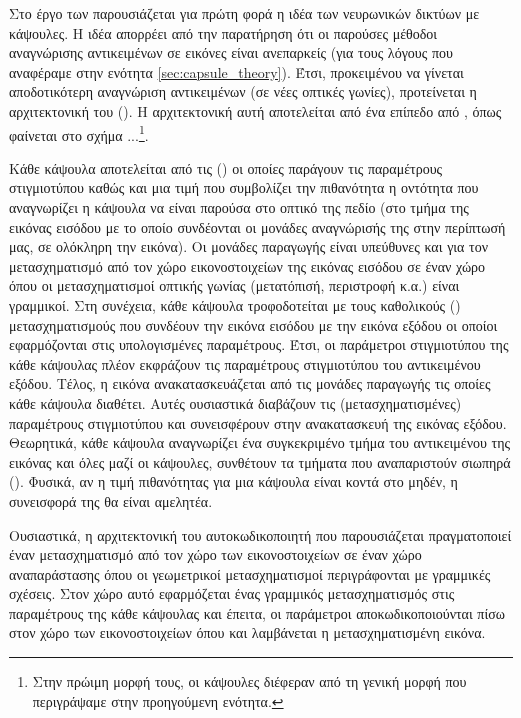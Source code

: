 Στο έργο των  \cite{hinton2011transforming} παρουσιάζεται για πρώτη φορά η ιδέα των νευρωνικών δικτύων με κάψουλες. Η ιδέα απορρέει από την παρατήρηση ότι οι παρούσες μέθοδοι αναγνώρισης αντικειμένων σε εικόνες είναι ανεπαρκείς (για τους λόγους που αναφέραμε στην ενότητα \ref{sec:capsule_theory}). Έτσι, προκειμένου να γίνεται αποδοτικότερη αναγνώριση αντικειμένων (σε νέες οπτικές γωνίες), προτείνεται η αρχιτεκτονική του  (). Η αρχιτεκτονική αυτή αποτελείται από ένα επίπεδο από , όπως φαίνεται στο σχήμα ...\footnote{Στην πρώιμη μορφή τους, οι κάψουλες διέφεραν από τη γενική μορφή που περιγράψαμε στην προηγούμενη ενότητα.}.\par

Κάθε κάψουλα αποτελείται από τις  () οι οποίες παράγουν τις παραμέτρους στιγμιοτύπου καθώς και μια τιμή που συμβολίζει την πιθανότητα η οντότητα που αναγνωρίζει η κάψουλα να είναι παρούσα στο οπτικό της πεδίο (στο τμήμα της εικόνας εισόδου με το οποίο συνδέονται οι μονάδες αναγνώρισής της \textemdash στην περίπτωσή μας, σε ολόκληρη την εικόνα). Οι μονάδες παραγωγής είναι υπεύθυνες και για τον μετασχηματισμό από τον χώρο εικονοστοιχείων της εικόνας εισόδου σε έναν χώρο όπου οι μετασχηματισμοί οπτικής γωνίας (μετατόπισή, περιστροφή κ.α.) είναι γραμμικοί. Στη συνέχεια, κάθε κάψουλα τροφοδοτείται με τους καθολικούς () μετασχηματισμούς που συνδέουν την εικόνα εισόδου με την εικόνα εξόδου οι οποίοι εφαρμόζονται στις υπολογισμένες παραμέτρους. Έτσι, οι παράμετροι στιγμιοτύπου της κάθε κάψουλας πλέον εκφράζουν τις παραμέτρους στιγμιοτύπου του αντικειμένου εξόδου. Τέλος, η εικόνα ανακατασκευάζεται από τις μονάδες παραγωγής  τις οποίες κάθε κάψουλα διαθέτει. Αυτές ουσιαστικά διαβάζουν τις (μετασχηματισμένες) παραμέτρους στιγμιοτύπου και συνεισφέρουν στην ανακατασκευή της εικόνας εξόδου. Θεωρητικά, κάθε κάψουλα αναγνωρίζει ένα συγκεκριμένο τμήμα του αντικειμένου της εικόνας και όλες μαζί οι κάψουλες, συνθέτουν τα τμήματα που αναπαριστούν σιωπηρά (). Φυσικά, αν η τιμή πιθανότητας για μια κάψουλα είναι κοντά στο μηδέν, η συνεισφορά της θα είναι αμελητέα.\par

Ουσιαστικά, η αρχιτεκτονική του αυτο\textendash κωδικοποιητή που παρουσιάζεται πραγματοποιεί έναν μετασχηματισμό από τον χώρο των εικονοστοιχείων σε έναν χώρο αναπαράστασης όπου οι γεωμετρικοί μετασχηματισμοί περιγράφονται με γραμμικές σχέσεις. Στον χώρο αυτό εφαρμόζεται ένας γραμμικός μετασχηματισμός στις παραμέτρους της κάθε κάψουλας και έπειτα, οι παράμετροι αποκωδικοποιούνται πίσω στον χώρο των εικονοστοιχείων όπου και λαμβάνεται η μετασχηματισμένη εικόνα.\par


